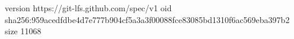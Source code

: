 version https://git-lfs.github.com/spec/v1
oid sha256:959acedfdbe4d7e777b904cf5a3a3f00088fce83085bd1310f6ac569eba397b2
size 11068
